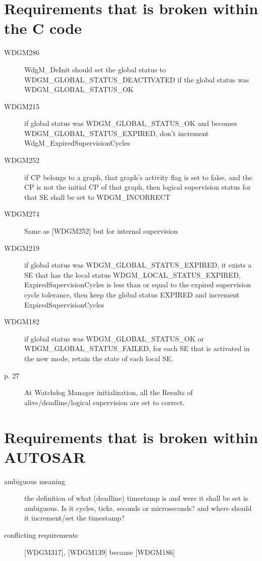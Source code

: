 \documentclass[11pt,a4paper]{article}
\begin{document}
\section{Requirements that is broken within the C code}
\begin{description}
  \item[WDGM286] \parbox[t]{0.8\linewidth}{WdgM\_DeInit should set the global
      status to WDGM\_GLOBAL\_STATUS\_DEACTIVATED if the global status was
    WDGM\_GLOBAL\_STATUS\_OK}
  \item[WDGM215] \parbox[t]{0.8\linewidth}{if global status was
      WDGM\_GLOBAL\_STATUS\_OK and becomes WDGM\_GLOBAL\_STATUS\_EXPIRED, don't
      increment WdgM\_ExpiredSupervisionCycles}
  \item[WDGM252] \parbox[t]{0.8\linewidth}{if CP belongs to a graph, that
      graph's activity flag is set to false, and the CP is not the initial CP of
      that graph, then logical supervision status for that SE shall be set to
      WDGM\_INCORRECT}
  \item[WDGM274] \parbox[t]{0.8\linewidth}{Same as [WDGM252] but for internal
      supervision}
  \item[WDGM219] \parbox[t]{0.8\linewidth}{if global status was
      WDGM\_GLOBAL\_STATUS\_EXPIRED, it exists a SE that has the local status
      WDGM\_LOCAL\_STATUS\_EXPIRED, ExpiredSupervisionCycles is less than or
      equal to the expired supervision cycle tolerance, then keep the global
      status EXPIRED and increment ExpiredSupervisionCycles}
  \item[WDGM182] \parbox[t]{0.8\linewidth}{if global status was WDGM\_GLOBAL\_STATUS\_OK or
      WDGM\_GLOBAL\_STATUS\_FAILED, for each SE that is activated in the new mode,
      retain the state of each local SE.}
  \item[p. 27] \parbox[t]{0.8\linewidth}{At Watchdog Manager initialization, all
      the Results of alive/deadline/logical supervision are set to correct.}
\end{description}

\section{Requirements that is broken within AUTOSAR}
\begin{description}
  \item[ambiguous meaning] the definition of what (deadline) timestamp is and were it shall
    be set is ambiguous. Is it cycles, ticks, seconds or microseconds? and where
    should it increment/set the timestamp?
  \item[conflicting requirements] [WDGM317], [WDGM139] because [WDGM186]
\end{description}
\end{document}
